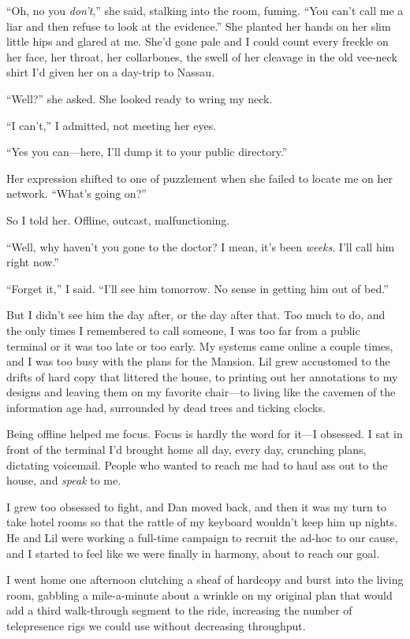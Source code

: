 “Oh, no you \emph{don't},” she said, stalking into the room,
fuming. “You can't call me a liar and then refuse to look at the
evidence.” She planted her hands on her slim little hips and glared
at me. She'd gone pale and I could count every freckle on her face,
her throat, her collarbones, the swell of her cleavage in the old
vee-neck shirt I'd given her on a day-trip to Nassau.

“Well?” she asked. She looked ready to wring my neck.

“I can't,” I admitted, not meeting her eyes.

“Yes you can—here, I'll dump it to your public directory.”

Her expression shifted to one of puzzlement when she failed to
locate me on her network. “What's going on?”

So I told her. Offline, outcast, malfunctioning.

“Well, why haven't you gone to the doctor? I mean, it's been
\emph{weeks}. I'll call him right now.”

“Forget it,” I said. “I'll see him tomorrow. No sense in getting
him out of bed.”

But I didn't see him the day after, or the day after that. Too much
to do, and the only times I remembered to call someone, I was too
far from a public terminal or it was too late or too early. My
systems came online a couple times, and I was too busy with the
plans for the Mansion. Lil grew accustomed to the drifts of hard
copy that littered the house, to printing out her annotations to my
designs and leaving them on my favorite chair—to living like the
cavemen of the information age had, surrounded by dead trees and
ticking clocks.

Being offline helped me focus. Focus is hardly the word for it—I
obsessed. I sat in front of the terminal I'd brought home all day,
every day, crunching plans, dictating voicemail. People who wanted
to reach me had to haul ass out to the house, and \emph{speak} to
me.

I grew too obsessed to fight, and Dan moved back, and then it was
my turn to take hotel rooms so that the rattle of my keyboard
wouldn't keep him up nights. He and Lil were working a full-time
campaign to recruit the ad-hoc to our cause, and I started to feel
like we were finally in harmony, about to reach our goal.

I went home one afternoon clutching a sheaf of hardcopy and burst
into the living room, gabbling a mile-a-minute about a wrinkle on
my original plan that would add a third walk-through segment to the
ride, increasing the number of telepresence rigs we could use
without decreasing throughput.

